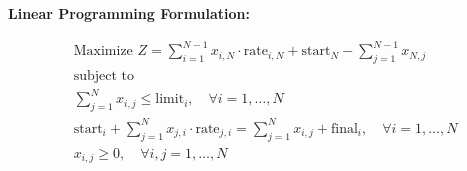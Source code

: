 \documentclass{article}
\begin{document}
\textbf{Linear Programming Formulation:}

\begin{align*}
    & \text{Maximize } Z = \sum_{i=1}^{N-1} x_{i,N} \cdot \text{rate}_{i,N} + \text{start}_N - \sum_{j=1}^{N-1} x_{N,j} \\
    & \text{subject to} \\
    & \sum_{j=1}^{N} x_{i,j} \leq \text{limit}_i, \quad \forall i = 1, \ldots, N \\
    & \text{start}_i + \sum_{j=1}^{N} x_{j,i} \cdot \text{rate}_{j,i} = \sum_{j=1}^{N} x_{i,j} + \text{final}_i, \quad \forall i = 1, \ldots, N \\
    & x_{i,j} \geq 0, \quad \forall i, j = 1, \ldots, N \\
\end{align*}
\end{document}
